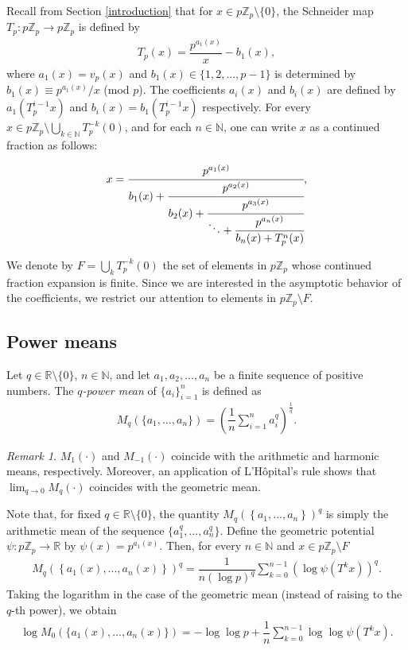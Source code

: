 \documentclass[11pt]{amsart}
\theoremstyle{remark}
\newtheorem{remark}[theorem]{Remark}
\numberwithin{equation}{section}
\newcommand{\N}{\mathbb{N}}
\newcommand{\R}{\mathbb{R}}
\newcommand{\Z}{\mathbb{Z}}
\newcommand{\Zp}{\mathbb{Z}_p}
\begin{document}
Recall from Section \ref{introduction} that for $x\in p\Z_p\setminus\{0\}$, the Schneider map $T_{p}:p\Z_{p}\rightarrow p\Z_{p}$ is defined by
  \begin{align*}
      T_{p}(x)=\dfrac{p^{a_{1}(x)}}{x}-b_{1}(x),
  \end{align*} where $a_{1}(x)=v_{p}(x)$ and $b_1(x)\in\{1,2,...,p-1\}$ is determined by $b_{1}(x)\equiv p^{a_{1}(x)}/x$ (mod $p$). The coefficients $a_i(x)$ and $b_i(x)$ are defined by $a_1(T_p^{i-1}x)$ and $b_i(x)=b_1(T_p^{i-1}x)$ respectively. For every $x\in p\Z_p\setminus \bigcup_{k\in \N}T_p^{-k}(0)$, and for each $n\in \N$, one can write $x$ as a continued fraction as follows:
  
  \begin{equation}\label{SchneiderContinued}
      x= \cfrac{p^{a_{1}(x)}}{b_{1}(x)+\cfrac{p^{a_{2}(x)}}{b_{2}(x)+\cfrac{p^{a_{3}(x)}}{\ddots + \cfrac{p^{a_{n}(x)}}{b_{n}(x)+T_{p}^n(x)}}}},
  \end{equation}
  
  We denote by $F=\bigcup_k T_p^{-k}(0)$ the set of elements in $p\Z_p$ whose continued fraction expansion is finite. Since we are interested in the asymptotic behavior of the coefficients, we restrict our attention to elements in $p\Z_p\setminus F.$




\subsection{Power means} 
Let $q\in \mathbb{R}\setminus\{ 0\}$, $n\in \N$,  and let $a_{1},a_{2},...,a_{n}$ be a finite sequence of positive numbers. The \textit{$q$-power mean} of $\{a_{i}\}^{n}_{i=1}$ is defined as
\begin{align*}   
M_{q}\left(\{a_1,...,a_n\}\right)=\left(\dfrac{1}{n}\sum^{n}_{i=1}a_{i}^{q}\right)^{\frac{1}{q}}.
\end{align*} 

\begin{remark}$M_1(\cdot)$ and $M_{-1}(\cdot)$ coincide with the arithmetic and harmonic means, respectively. Moreover, an application of L'H\^opital's rule shows that $\lim_{q\to 0}M_q(\cdot)$ coincides with the geometric mean.
\end{remark}
Note that, for fixed $q\in \R\setminus \{0\}$, the quantity $M_{q}\left(\left\{a_1,...,a_n\right\}\right)^{q}$ is simply the arithmetic mean of the sequence
$\{a_{1}^{q},...,a_{n}^{q}\}$. Define the geometric potential $\psi\colon p\Z_p\to \R$ by $\psi(x)=p^{a_1(x)}$. Then, for every $n\in \N$ and $x\in p\Zp\setminus F$  
\begin{align}\label{QpowermeanP}
    M_{q}\left(\left\{a_1(x),...,a_n(x)\right\}\right)^{q}=\dfrac{1}{n(\log p)^{q}}\sum^{n-1}_{k=0}\left(\log \psi (T^{k}x)\right)^{q}.
\end{align}
Taking the logarithm in the case of the geometric mean (instead of raising to the $q$-th power), we obtain
\begin{align}\label{QpowermeanG}
    \log M_0(\{a_1(x),...,a_n(x)\})=-\log\log p+\dfrac{1}{n}\sum_{k=0}^{n-1} \log \log \psi (T^{k}x).
\end{align}
    
\end{document}
